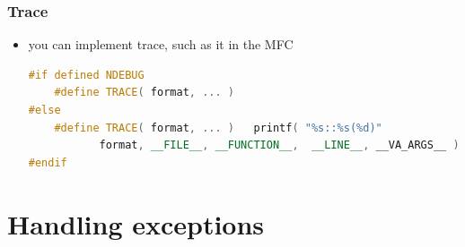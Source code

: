 \documentclass[a4paper,12pt,twoside]{book}
\begin{document}
\subsubsection{Trace}
\begin{itemize}
\item you can implement trace, such as it in the MFC
\begin{lstlisting}[frame=single, language=c++]
#if defined NDEBUG
    #define TRACE( format, ... )
#else
    #define TRACE( format, ... )   printf( "%s::%s(%d)"
           format, __FILE__, __FUNCTION__,  __LINE__, __VA_ARGS__ )
#endif
\end{lstlisting}

\end{itemize}

\section{Handling exceptions}
\end{document}
